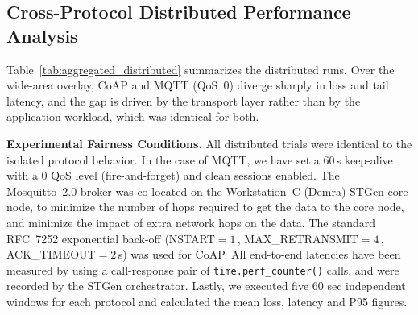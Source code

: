 \documentclass[jsan,article,submit,moreauthors,pdftex]{Definitions/mdpi}
\begin{document}
\subsection{Cross-Protocol Distributed Performance Analysis}
\label{subsec:cross-protocol}
Table~\ref{tab:aggregated_distributed} summarizes the distributed runs. Over the wide-area overlay, CoAP and MQTT (QoS~0) diverge sharply in loss and tail latency, and the gap is driven by the transport layer rather than by the application workload, which was identical for both.

\textbf{Experimental Fairness Conditions.} All distributed trials were identical to the isolated protocol behavior. In the case of MQTT, we have set a 60\,s keep-alive with a 0 QoS level (fire-and-forget) and clean sessions enabled. The Mosquitto~2.0 broker was co-located on the Workstation~C (Demra) STGen core node, to minimize the number of hops required to get the data to the core node, and minimize the impact of extra network hops on the data. The standard RFC~7252 exponential back-off (NSTART$=1$\,, MAX\_RETRANSMIT$=4$\,, ACK\_TIMEOUT$=2$\,s) was used for CoAP. All end-to-end latencies have been measured by using a call-response pair of \texttt{time.perf\_counter()} calls, and were recorded by the STGen orchestrator. Lastly, we executed five 60 sec independent windows for each protocol and calculated the mean loss, latency and P95 figures.
\end{document}
